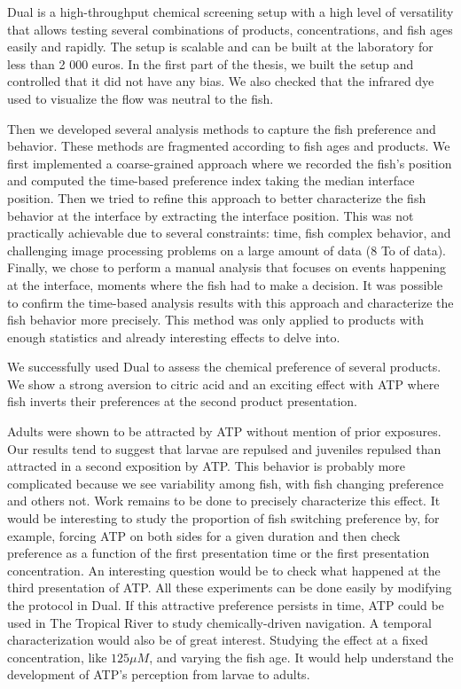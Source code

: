  Dual is a high-throughput chemical screening setup with a high level of versatility that allows testing several combinations of products, concentrations, and fish ages easily and rapidly. The setup is scalable and can be built at the laboratory for less than 2 000 euros. In the first part of the thesis, we built the setup and controlled that it did not have any bias. We also checked that the infrared dye used to visualize the flow was neutral to the fish.

  Then we developed several analysis methods to capture the fish preference and behavior. These methods are fragmented according to fish ages and products. We first implemented a coarse-grained approach where we recorded the fish's position and computed the time-based preference index taking the median interface position. Then we tried to refine this approach to better characterize the fish behavior at the interface by extracting the interface position. This was not practically achievable due to several constraints: time, fish complex behavior, and challenging image processing problems on a large amount of data (8 To of data). Finally, we chose to perform a manual analysis that focuses on events happening at the interface, moments where the fish had to make a decision. It was possible to confirm the time-based analysis results with this approach and characterize the fish behavior more precisely. This method was only applied to products with enough statistics and already interesting effects to delve into.

  We successfully used Dual to assess the chemical preference of several products. We show a strong aversion to citric acid and an exciting effect with ATP where fish inverts their preferences at the second product presentation.

  Adults were shown to be attracted by ATP without mention of prior exposures. Our results tend to suggest that larvae are repulsed and juveniles repulsed than attracted in a second exposition by ATP. This behavior is probably more complicated because we see variability among fish, with fish changing preference and others not. Work remains to be done to precisely characterize this effect. It would be interesting to study the proportion of fish switching preference by, for example, forcing ATP on both sides for a given duration and then check preference as a function of the first presentation time or the first presentation concentration. An interesting question would be to check what happened at the third presentation of ATP. All these experiments can be done easily by modifying the protocol in Dual. If this attractive preference persists in time, ATP could be used in The Tropical River to study chemically-driven navigation. A temporal characterization would also be of great interest. Studying the effect at a fixed concentration, like $125 \mu M$, and varying the fish age. It would help understand the development of ATP's perception from larvae to adults.

